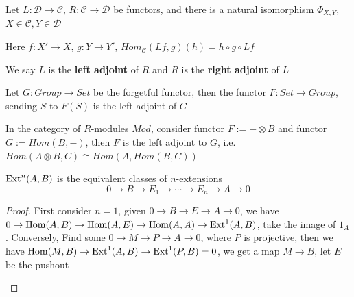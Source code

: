 \documentclass[main]{subfiles}
\begin{document}
\begin{definition}
Let $L:\mathscr D\to\mathscr C$, $R:\mathscr C\to\mathscr D$ be functors, and there is a natural isomorphism $\Phi_{X,Y}$, $X\in\mathscr C,Y\in\mathscr D$
\begin{center}
\end{center}
Here $f:X'\to X$, $g:Y\to Y'$, $Hom_{\mathscr C}(Lf,g)(h)=h\circ g\circ Lf$ \par
We say $L$ is the \textbf{left adjoint} of $R$ and $R$ is the \textbf{right adjoint} of $L$
\end{definition}

\begin{example}
Let $G:Group\to Set$ be the forgetful functor, then the functor $F:Set\to Group$, sending $S$ to $F(S)$ is the left adjoint of $G$ \par
In the category of $R$-modules $Mod$, consider functor $F:=-\otimes B$ and functor $G:=Hom(B,-)$, then $F$ is the left adjoint to $G$, i.e. $Hom(A\otimes B,C)\cong Hom(A,Hom(B,C))$
\end{example}

\begin{theorem}
$\operatorname{Ext}^n(A,B)$ is the equivalent classes of $n$-extensions
\[0\to B\to E_1\to\cdots\to E_n\to A\to0\]
\end{theorem}

\begin{proof}
First consider $n=1$, given $0\to B\to E\to A\to0$, we have $0\to \operatorname{Hom}(A,B)\to\operatorname{Hom}(A,E)\to\operatorname{Hom}(A,A)\to\operatorname{Ext}^1(A,B)$, take the image of $1_A$. Conversely, Find some $0\to M\to P\to A\to0$, where $P$ is projective, then we have $\operatorname{Hom}(M,B)\to\operatorname{Ext}^1(A,B)\to\operatorname{Ext}^1(P,B)=0$, we get a map $M\to B$, let $E$ be the pushout
\begin{center}
\end{center}
\end{proof}
\end{document}
